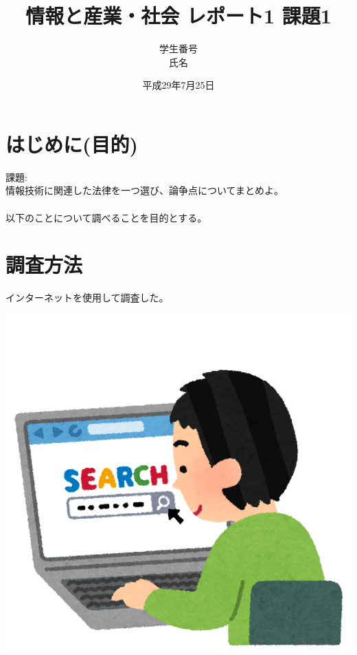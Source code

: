 \documentclass[a4paper,12pt]{jarticle}
\title{情報と産業・社会 レポート1 課題1}
\author{学生番号\\氏名}
\date{平成29年7月25日}
\begin{document}
\maketitle
\tableofcontents
\section{はじめに(目的)}
課題:\\
情報技術に関連した法律を一つ選び、論争点についてまとめよ。\\
\\
以下のことについて調べることを目的とする。
\section{調査方法}
インターネットを使用して調査した。
\begin{center}
\includegraphics[width=100truemm]{computer_search_kensaku.png}
\end{center}
\end{document}

